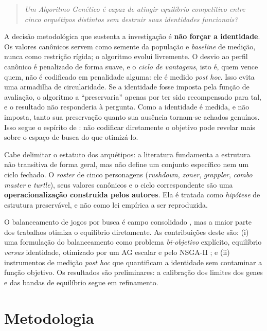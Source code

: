 \documentclass[10pt,conference]{IEEEtran}
\begin{document}
\begin{quote}
\emph{Um Algoritmo Genético é capaz de atingir equilíbrio competitivo entre cinco
arquétipos distintos sem destruir suas identidades funcionais?}
\end{quote}

A decisão metodológica que sustenta a investigação é \textbf{não forçar a
identidade}. Os valores canônicos servem como semente da população e
\emph{baseline} de medição, nunca como restrição rígida; o algoritmo evolui
livremente. O desvio ao perfil canônico é penalizado de forma suave, e o
\emph{ciclo de vantagens}, isto é, quem vence quem, não é codificado em penalidade
alguma: ele é medido \emph{post hoc}. Isso evita uma armadilha de circularidade. Se
a identidade fosse imposta pela função de avaliação, o algoritmo a ``preservaria''
apenas por ter sido recompensado para tal, e o resultado não responderia à
pergunta. Como a identidade é medida, e não imposta, tanto sua preservação quanto
sua ausência tornam-se achados genuínos. Isso segue o espírito de
\cite{lehman2011novelty}: não codificar diretamente o objetivo pode revelar mais
sobre o espaço de busca do que otimizá-lo.

Cabe delimitar o estatuto dos arquétipos: a literatura fundamenta a estrutura não
transitiva de forma geral, mas não define um conjunto específico nem um ciclo
fechado. O \emph{roster} de cinco personagens (\emph{rushdown}, \emph{zoner},
\emph{grappler}, \emph{combo master} e \emph{turtle}), seus valores canônicos e o
ciclo correspondente são uma \textbf{operacionalização construída pelos autores}.
Ela é tratada como \emph{hipótese} de estrutura preservável, e não como lei
empírica a ser reproduzida.

O balanceamento de jogos por busca é campo consolidado
\cite{togelius2011searchbased, hom2007automatic, chen2014mmorpg}, mas a maior parte
dos trabalhos otimiza o equilíbrio diretamente. As contribuições deste são: (i) uma
formulação do balanceamento como problema \emph{bi-objetivo} explícito, equilíbrio
\emph{versus} identidade, otimizado por um AG escalar e pelo NSGA-II
\cite{deb2002nsga}; e (ii) instrumentos de medição \emph{post hoc} que quantificam
a identidade sem contaminar a função objetivo. Os resultados são preliminares: a
calibração dos limites dos genes e das bandas de equilíbrio segue em refinamento.

\section{Metodologia}
\end{document}
